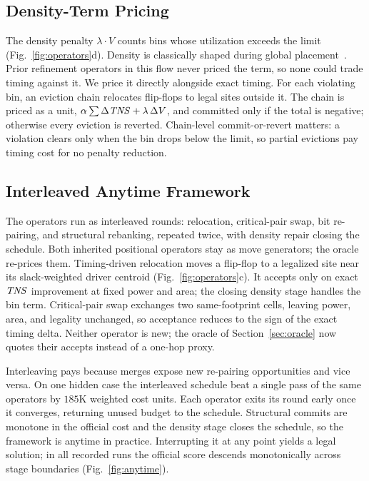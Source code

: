 \subsection{Density-Term Pricing}\label{sec:density}

The density penalty $\lambda \cdot V$ counts bins whose utilization exceeds the limit (Fig.~\ref{fig:operators}d). Density is classically shaped during global placement~\cite{lu2015eplace,chen2008ntuplace3}. Prior refinement operators in this flow never priced the term, so none could trade timing against it. We price it directly alongside exact timing. For each violating bin, an eviction chain relocates flip-flops to legal sites outside it. The chain is priced as a unit, $\alpha \sum \Delta\mathit{TNS} + \lambda\,\Delta V$, and committed only if the total is negative; otherwise every eviction is reverted. Chain-level commit-or-revert matters: a violation clears only when the bin drops below the limit, so partial evictions pay timing cost for no penalty reduction.

\subsection{Interleaved Anytime Framework}\label{sec:framework}

The operators run as interleaved rounds: relocation, critical-pair swap, bit re-pairing, and structural rebanking, repeated twice, with density repair closing the schedule. Both inherited positional operators stay as move generators; the oracle re-prices them. Timing-driven relocation moves a flip-flop to a legalized site near its slack-weighted driver centroid (Fig.~\ref{fig:operators}c). It accepts only on exact $\mathit{TNS}$ improvement at fixed power and area; the closing density stage handles the bin term. Critical-pair swap exchanges two same-footprint cells, leaving power, area, and legality unchanged, so acceptance reduces to the sign of the exact timing delta. Neither operator is new; the oracle of Section~\ref{sec:oracle} now quotes their accepts instead of a one-hop proxy.

Interleaving pays because merges expose new re-pairing opportunities and vice versa. On one hidden case the interleaved schedule beat a single pass of the same operators by $185$K weighted cost units. Each operator exits its round early once it converges, returning unused budget to the schedule. Structural commits are monotone in the official cost and the density stage closes the schedule, so the framework is anytime in practice. Interrupting it at any point yields a legal solution; in all recorded runs the official score descends monotonically across stage boundaries (Fig.~\ref{fig:anytime}).


